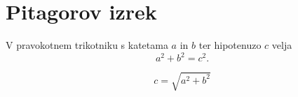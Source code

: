 \documentclass{article}
\begin{document}
\section*{Pitagorov izrek}
V pravokotnem trikotniku s katetama \(a\) in \(b\) ter hipotenuzo \(c\) velja
\[
a^2 + b^2 = c^2.
\]

\[
c = \sqrt{a^2 + b^2}
\]
\end{document}
